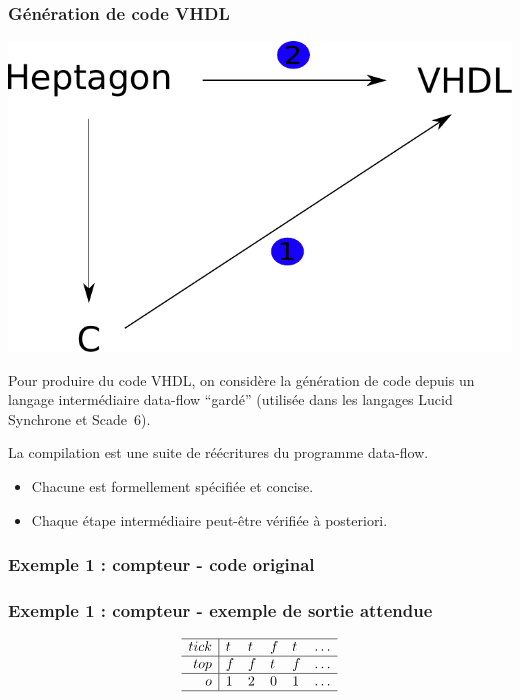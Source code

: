 \documentclass{beamer}
\newcommand{\lucy}{{\sc Lucid Synchrone}}
\newcommand{\scadesix}{{\sc Scade~6}}
\begin{document}
\begin{frame}
  \frametitle{Génération de code VHDL}

  \begin{center}
    \includegraphics[scale=0.4]{sens_traduction.pdf}
  \end{center}

  Pour produire du code VHDL, on considère la génération de code depuis un
  langage intermédiaire data-flow ``gardé'' (utilisée dans les langages \lucy{}
  et \scadesix{}).

  La compilation est une suite de réécritures du programme data-flow.

  \begin{itemize}
  \item Chacune est formellement spécifiée et concise.
  \item Chaque étape intermédiaire peut-être vérifiée à posteriori.
  \end{itemize}
\end{frame}

\begin{frame}
  \frametitle{Exemple 1 : compteur - code original}

  
\end{frame}


\begin{frame}
  \frametitle{Exemple 1 : compteur - exemple de sortie attendue}

  \[
  \begin{array}{r|llllllllllllllllllllllllllll}
    \hline
    tick & t & t & f & t & \dots \\
    \hline
    top & f & f & t & f & \dots \\
    \hline
    o & 1 & 2 & 0 & 1 & \dots \\
    \hline
  \end{array}
  \]
\end{frame}
\end{document}
